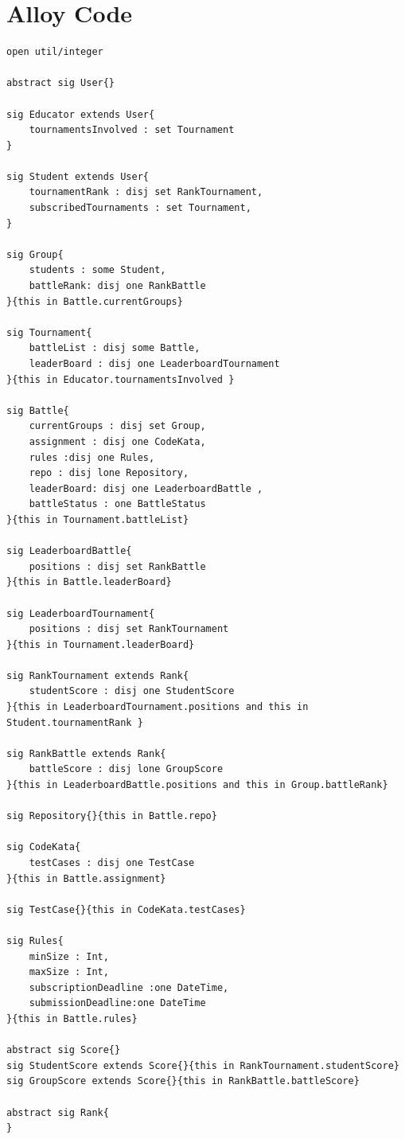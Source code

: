 \section{Alloy Code}

\begin{lstlisting}[language=alloy,label={lst:alloy_code}]
open util/integer

abstract sig User{}

sig Educator extends User{
	tournamentsInvolved : set Tournament
}

sig Student extends User{
	tournamentRank : disj set RankTournament,
	subscribedTournaments : set Tournament,
}

sig Group{
	students : some Student,
	battleRank: disj one RankBattle 
}{this in Battle.currentGroups}

sig Tournament{
	battleList : disj some Battle,
	leaderBoard : disj one LeaderboardTournament
}{this in Educator.tournamentsInvolved }

sig Battle{
	currentGroups : disj set Group,
	assignment : disj one CodeKata,
	rules :disj one Rules,
	repo : disj lone Repository,
	leaderBoard: disj one LeaderboardBattle ,
    battleStatus : one BattleStatus
}{this in Tournament.battleList}

sig LeaderboardBattle{
	positions : disj set RankBattle
}{this in Battle.leaderBoard}

sig LeaderboardTournament{
	positions : disj set RankTournament
}{this in Tournament.leaderBoard}

sig RankTournament extends Rank{
    studentScore : disj one StudentScore
}{this in LeaderboardTournament.positions and this in Student.tournamentRank }

sig RankBattle extends Rank{
    battleScore : disj lone GroupScore
}{this in LeaderboardBattle.positions and this in Group.battleRank}

sig Repository{}{this in Battle.repo}

sig CodeKata{
	testCases : disj one TestCase
}{this in Battle.assignment}

sig TestCase{}{this in CodeKata.testCases}

sig Rules{
	minSize : Int,
	maxSize : Int,
	subscriptionDeadline :one DateTime,
	submissionDeadline:one DateTime
}{this in Battle.rules}

abstract sig Score{}
sig StudentScore extends Score{}{this in RankTournament.studentScore}
sig GroupScore extends Score{}{this in RankBattle.battleScore}

abstract sig Rank{
}


\end{lstlisting}
